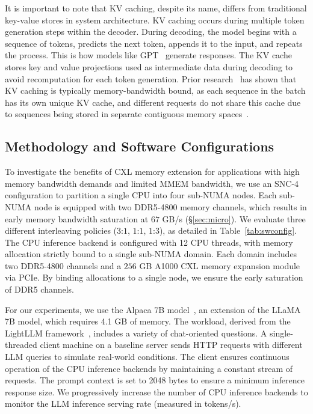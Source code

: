 It is important to note that KV caching, despite its name, differs from traditional key-value stores in system architecture. KV caching occurs during multiple token generation steps within the decoder. During decoding, the model begins with a sequence of tokens, predicts the next token, appends it to the input, and repeats the process. This is how models like GPT~\cite{gpt4} generate responses. The KV cache stores key and value projections used as intermediate data during decoding to avoid recomputation for each token generation. Prior research~\cite{kvcache} has shown that KV caching is typically memory-bandwidth bound, as each sequence in the batch has its own unique KV cache, and different requests do not share this cache due to sequences being stored in separate contiguous memory spaces~\cite{vllmpaper}.

\subsection{Methodology and Software Configurations}
To investigate the benefits of CXL memory extension for applications with high memory bandwidth demands and limited MMEM bandwidth, we use an SNC-4 configuration to partition a single CPU into four sub-NUMA nodes. Each sub-NUMA node is equipped with two DDR5-4800 memory channels, which results in early memory bandwidth saturation at $67$ GB/s (\S\ref{sec:micro}). We evaluate three different interleaving policies ($3$:$1$, $1$:$1$, $1$:$3$), as detailed in Table~\ref{tab:swconfig}. The CPU inference backend is configured with 12 CPU threads, with memory allocation strictly bound to a single sub-NUMA domain. Each domain includes two DDR5-4800 channels and a $256$ GB A1000 CXL memory expansion module via PCIe. By binding allocations to a single node, we ensure the early saturation of DDR5 channels. 

For our experiments, we use the Alpaca 7B model~\cite{alpaca}, an extension of the LLaMA 7B model, which requires 4.1 GB of memory. The workload, derived from the LightLLM framework~\cite{lightllm}, includes a variety of chat-oriented questions. A single-threaded client machine on a baseline server sends HTTP requests with different LLM queries to simulate real-world conditions. The client ensures continuous operation of the CPU inference backends by maintaining a constant stream of requests. The prompt context is set to 2048 bytes to ensure a minimum inference response size. We progressively increase the number of CPU inference backends to monitor the LLM inference serving rate (measured in tokens/s).

